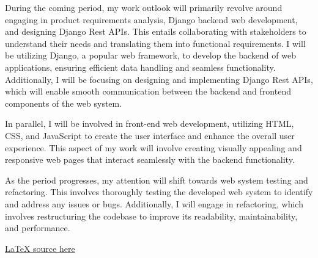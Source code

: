 \documentclass{article}
\begin{document}
During the coming period, my work outlook will primarily revolve around engaging in product requirements analysis, Django backend web development, and designing Django Rest APIs. This entails collaborating with stakeholders to understand their needs and translating them into functional requirements. I will be utilizing Django, a popular web framework, to develop the backend of web applications, ensuring efficient data handling and seamless functionality. Additionally, I will be focusing on designing and implementing Django Rest APIs, which will enable smooth communication between the backend and frontend components of the web system.
\newline

In parallel, I will be involved in front-end web development, utilizing HTML, CSS, and JavaScript to create the user interface and enhance the overall user experience. This aspect of my work will involve creating visually appealing and responsive web pages that interact seamlessly with the backend functionality.
\newline

As the period progresses, my attention will shift towards web system testing and refactoring. This involves thoroughly testing the developed web system to identify and address any issues or bugs. Additionally, I will engage in refactoring, which involves restructuring the codebase to improve its readability, maintainability, and performance.


\href{https://www.github.com/ammar-faifi/}{LaTeX source here}
\end{document}
